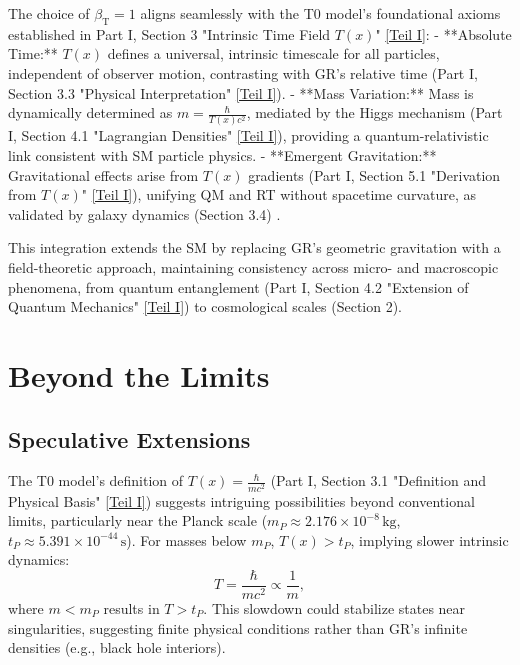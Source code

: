 \documentclass[12pt,a4paper]{article}
\newcommand{\Tfield}{T(x)}
\newcommand{\betaT}{\beta_{\text{T}}}
\begin{document}
	The choice of \(\betaT = 1\) aligns seamlessly with the T0 model’s foundational axioms established in Part I, Section 3 "Intrinsic Time Field \(\Tfield\)" \href{https://github.com/jpascher/T0-Time-Mass-Duality/tree/main/2/pdf/English/QMRelTimeMassPart1En.pdf}{[Teil I]}:
	- **Absolute Time:** \(\Tfield\) defines a universal, intrinsic timescale for all particles, independent of observer motion, contrasting with GR’s relative time (Part I, Section 3.3 "Physical Interpretation" \href{https://github.com/jpascher/T0-Time-Mass-Duality/tree/main/2/pdf/English/QMRelTimeMassPart1En.pdf}{[Teil I]}).
	- **Mass Variation:** Mass is dynamically determined as \(m = \frac{\hbar}{\Tfield c^2}\), mediated by the Higgs mechanism (Part I, Section 4.1 "Lagrangian Densities" \href{https://github.com/jpascher/T0-Time-Mass-Duality/tree/main/2/pdf/English/QMRelTimeMassPart1En.pdf}{[Teil I]}), providing a quantum-relativistic link consistent with SM particle physics.
	- **Emergent Gravitation:** Gravitational effects arise from \(\Tfield\) gradients (Part I, Section 5.1 "Derivation from \(\Tfield\)" \href{https://github.com/jpascher/T0-Time-Mass-Duality/tree/main/2/pdf/English/QMRelTimeMassPart1En.pdf}{[Teil I]}), unifying QM and RT without spacetime curvature, as validated by galaxy dynamics (Section 3.4) \cite{pascher_lagrange_2025}.
	
	This integration extends the SM by replacing GR’s geometric gravitation with a field-theoretic approach, maintaining consistency across micro- and macroscopic phenomena, from quantum entanglement (Part I, Section 4.2 "Extension of Quantum Mechanics" \href{https://github.com/jpascher/T0-Time-Mass-Duality/tree/main/2/pdf/English/QMRelTimeMassPart1En.pdf}{[Teil I]}) to cosmological scales (Section 2).
	
	\section{Beyond the Limits}
	\label{sec:beyond_limits}
	
	\subsection{Speculative Extensions}
	\label{subsec:speculative_extensions}
	
	The T0 model’s definition of \(\Tfield = \frac{\hbar}{m c^2}\) (Part I, Section 3.1 "Definition and Physical Basis" \href{https://github.com/jpascher/T0-Time-Mass-Duality/tree/main/2/pdf/English/QMRelTimeMassPart1En.pdf}{[Teil I]}) suggests intriguing possibilities beyond conventional limits, particularly near the Planck scale (\(m_P \approx 2.176 \times 10^{-8} \, \text{kg}\), \(t_P \approx 5.391 \times 10^{-44} \, \text{s}\)). For masses below \(m_P\), \(\Tfield > t_P\), implying slower intrinsic dynamics:
	\begin{equation}
		T = \frac{\hbar}{m c^2} \propto \frac{1}{m},
		\label{eq:intrinsic_time_repeat}
	\end{equation}
	where \(m < m_P\) results in \(T > t_P\). This slowdown could stabilize states near singularities, suggesting finite physical conditions rather than GR’s infinite densities (e.g., black hole interiors).
	
\end{document}
